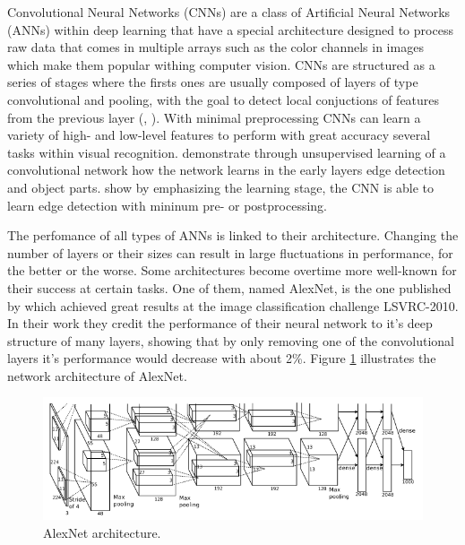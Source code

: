 Convolutional Neural Networks (CNNs) are a class of Artificial Neural Networks (ANNs) within deep learning that have a special architecture designed to process raw data that comes in multiple arrays such as the color channels in images which make them popular withing computer vision. CNNs are structured as a series of stages where the firsts ones are usually composed of layers of type convolutional and pooling, with the goal to detect local conjuctions of features from the previous layer (\parencite{Lecun2015}, \parencite{Jarrett2009}). With minimal preprocessing CNNs can learn a variety of high- and low-level features to perform with great accuracy several tasks within visual recognition. \textcite{Lee2009} demonstrate through unsupervised learning of a convolutional network how the network learns in the early layers edge detection and object parts. \textcite{Turaga2010} show by emphasizing the learning stage, the CNN is able to learn edge detection with mininum pre- or postprocessing.

The perfomance of all types of ANNs is linked to their architecture. Changing the number of layers or their sizes can result in large fluctuations in performance, for the better or the worse. Some architectures become overtime more well-known for their success at certain tasks. One of them, named AlexNet, is the one published by \textcite{Krizhevsky2012} which achieved great results at the \textcite{ImageNet} image classification challenge LSVRC-2010. In their work they credit the performance of their neural network to it's deep structure of many layers, showing that by only removing one of the convolutional layers it's performance would decrease with about 2\%. Figure \ref{fig:alexnet_orig} illustrates the network architecture of AlexNet.

\begin{figure}
	\centering
	\includegraphics[width=\textwidth]{img/methods/alexnet_original.png}
	\caption{AlexNet architecture.}
	\label{fig:alexnet_orig}
\end{figure}

